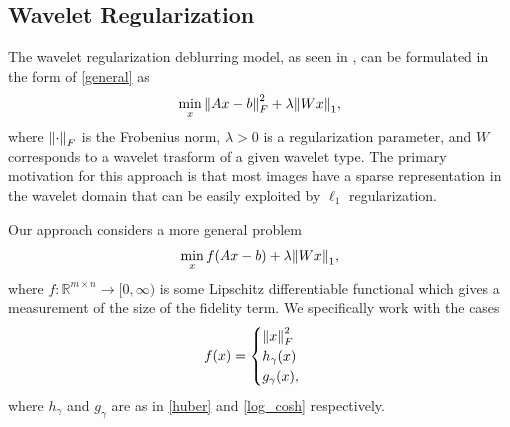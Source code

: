 \documentclass[10pt,a4paper]{article}
\newcommand{\R}{\mathbb{R}}
\begin{document}
\subsection{Wavelet Regularization}

The wavelet regularization deblurring model, as seen in \cite{FISTA}, can be formulated in the form of \eqref{general} as 
\begin{equation} \label{wavelet_orig}
\min_{x} \norm{ Ax - b }_F^2 + \lambda \norm{Wx}_1 ,
\end{equation}
where $\norm{\cdot}_F$ is the Frobenius norm, $\lambda>0$ is a regularization parameter, and $W$ corresponds to a wavelet trasform of a given wavelet type. The primary motivation for this approach is that most images have a sparse representation in the wavelet domain that can be easily exploited by $\ell_1$ regularization. 

Our approach considers a more general problem
\begin{equation} \label{wavelet}
\min_{x} f(Ax - b ) + \lambda \norm{Wx}_1,
\end{equation}
where $f: \R^{m \times n} \rightarrow [0,\infty)$ is some Lipschitz differentiable functional which gives a measurement of the size of the fidelity term. We specifically work with the cases 
\begin{equation} \label{fidelities}
f(x) = \begin{cases}
\norm{x}_F^2 \\
h_\gamma(x) \\
g_\gamma(x),
\end{cases}
\end{equation}
where $h_\gamma$ and $g_\gamma$ are as in \eqref{huber} and \eqref{log_cosh} respectively. 

\end{document}

